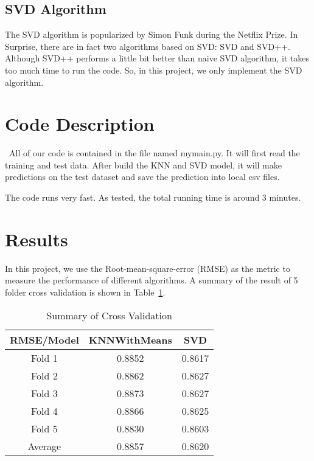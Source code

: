 \documentclass[12pt]{article}
\begin{document}
\subsection{SVD Algorithm}
The SVD algorithm is popularized by Simon Funk during the Netflix Prize. In Surprise, there are  in fact two algorithms based on SVD: SVD and SVD++. Although SVD++ performs a little bit better than naive SVD algorithm, it takes too much time to run the code. So, in this project, we only implement the SVD algorithm.

\section{Code Description}
\quad\ All of our code is contained in the file named mymain.py. It will first read the training and test data. After build the KNN and SVD model, it will make predictions on the test dataset and save the prediction into local csv files.

The code runs very fast. As tested, the total running time is around 3 minutes.

\section{Results}
In this project, we use the Root-mean-square-error (RMSE) as the metric to measure the performance of different algorithms. A summary of the result of 5 folder cross validation is shown in Table~\ref{result}.


\begin{table}[htb]
 \caption{Summary of Cross Validation} \label{result}
 \vspace{0.1in}
\begin{center}
  \begin{tabular}{  c  c  c}
    \hline
    RMSE/Model            & KNNWithMeans        & SVD     \\ \hline
    Fold 1                    & 0.8852                    & 0.8617 \\ \hline
    Fold 2                    & 0.8862                    & 0.8627 \\ \hline
    Fold 3                    & 0.8873                    &0.8627 \\ \hline
    Fold 4                    & 0.8866                    & 0.8625 \\ \hline
    Fold 5                    & 0.8830                    & 0.8603 \\ \hline
    Average                 & 0.8857                    &  0.8620 \\ \hline      
  \end{tabular}
\end{center}
\end{table}
\end{document}
